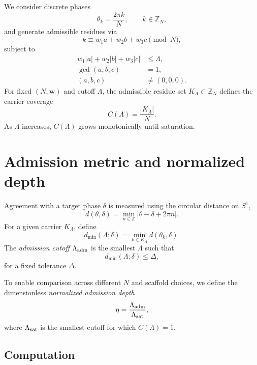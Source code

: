 \documentclass[aps,prd,twocolumn,nofootinbib,superscriptaddress]{revtex4-2}
\begin{document}
We consider discrete phases
\begin{equation}
\theta_k=\frac{2\pi k}{N},\qquad k\in\mathbb{Z}_N,
\end{equation}
and generate admissible residues via
\begin{equation}
k\equiv w_1 a+w_2 b+w_3 c\pmod N,
\end{equation}
subject to
\begin{align}
w_1|a|+w_2|b|+w_3|c| &\le \Lambda,\\
\gcd(a,b,c)&=1,\\
(a,b,c)&\neq (0,0,0).
\end{align}
For fixed $(N,\mathbf{w})$ and cutoff $\Lambda$, the admissible residue set $K_\Lambda\subset\mathbb{Z}_N$ defines the carrier coverage
\begin{equation}
C(\Lambda)=\frac{|K_\Lambda|}{N}.
\end{equation}
As $\Lambda$ increases, $C(\Lambda)$ grows monotonically until saturation.

\section{Admission metric and normalized depth}

Agreement with a target phase $\delta$ is measured using the circular distance on $S^1$,
\begin{equation}
d(\theta,\delta)=\min_{n\in\mathbb{Z}}|\theta-\delta+2\pi n|.
\end{equation}
For a given carrier $K_\Lambda$, define
\begin{equation}
d_{\min}(\Lambda;\delta)=\min_{k\in K_\Lambda} d(\theta_k,\delta).
\end{equation}
The \emph{admission cutoff} $\Lambda_{\rm adm}$ is the smallest $\Lambda$ such that
\begin{equation}
d_{\min}(\Lambda;\delta)\le \Delta,
\end{equation}
for a fixed tolerance $\Delta$.

To enable comparison across different $N$ and scaffold choices, we define the dimensionless \emph{normalized admission depth}
\begin{equation}
\eta=\frac{\Lambda_{\rm adm}}{\Lambda_{\rm sat}},
\end{equation}
where $\Lambda_{\rm sat}$ is the smallest cutoff for which $C(\Lambda)=1$.

\subsection{Computation}
\end{document}
